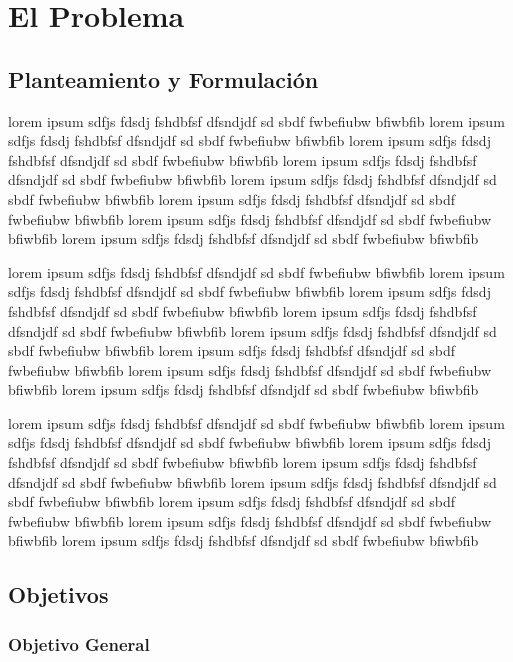 \chapter{El Problema}

\section{Planteamiento y Formulaci\'on}

	lorem ipsum sdfjs fdsdj fshdbfsf dfsndjdf sd sbdf fwbefiubw bfiwbfib lorem ipsum sdfjs fdsdj fshdbfsf dfsndjdf sd sbdf fwbefiubw bfiwbfib lorem ipsum sdfjs fdsdj fshdbfsf dfsndjdf sd sbdf fwbefiubw bfiwbfib lorem ipsum sdfjs fdsdj fshdbfsf dfsndjdf sd sbdf fwbefiubw bfiwbfib lorem ipsum sdfjs fdsdj fshdbfsf dfsndjdf sd sbdf fwbefiubw bfiwbfib lorem ipsum sdfjs fdsdj fshdbfsf dfsndjdf sd sbdf fwbefiubw bfiwbfib lorem ipsum sdfjs fdsdj fshdbfsf dfsndjdf sd sbdf fwbefiubw bfiwbfib lorem ipsum sdfjs fdsdj fshdbfsf dfsndjdf sd sbdf fwbefiubw bfiwbfib

	
	lorem ipsum sdfjs fdsdj fshdbfsf dfsndjdf sd sbdf fwbefiubw bfiwbfib lorem ipsum sdfjs fdsdj fshdbfsf dfsndjdf sd sbdf fwbefiubw bfiwbfib lorem ipsum sdfjs fdsdj fshdbfsf dfsndjdf sd sbdf fwbefiubw bfiwbfib lorem ipsum sdfjs fdsdj fshdbfsf dfsndjdf sd sbdf fwbefiubw bfiwbfib lorem ipsum sdfjs fdsdj fshdbfsf dfsndjdf sd sbdf fwbefiubw bfiwbfib lorem ipsum sdfjs fdsdj fshdbfsf dfsndjdf sd sbdf fwbefiubw bfiwbfib lorem ipsum sdfjs fdsdj fshdbfsf dfsndjdf sd sbdf fwbefiubw bfiwbfib lorem ipsum sdfjs fdsdj fshdbfsf dfsndjdf sd sbdf fwbefiubw bfiwbfib

	lorem ipsum sdfjs fdsdj fshdbfsf dfsndjdf sd sbdf fwbefiubw bfiwbfib lorem ipsum sdfjs fdsdj fshdbfsf dfsndjdf sd sbdf fwbefiubw bfiwbfib lorem ipsum sdfjs fdsdj fshdbfsf dfsndjdf sd sbdf fwbefiubw bfiwbfib lorem ipsum sdfjs fdsdj fshdbfsf dfsndjdf sd sbdf fwbefiubw bfiwbfib lorem ipsum sdfjs fdsdj fshdbfsf dfsndjdf sd sbdf fwbefiubw bfiwbfib lorem ipsum sdfjs fdsdj fshdbfsf dfsndjdf sd sbdf fwbefiubw bfiwbfib lorem ipsum sdfjs fdsdj fshdbfsf dfsndjdf sd sbdf fwbefiubw bfiwbfib lorem ipsum sdfjs fdsdj fshdbfsf dfsndjdf sd sbdf fwbefiubw bfiwbfib

\section{Objetivos}
	
	
\subsection{Objetivo General}

